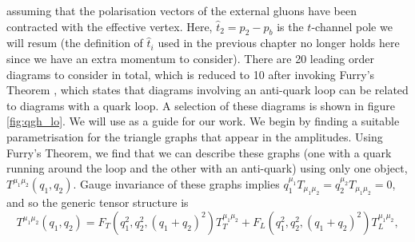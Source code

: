 assuming that the polarisation vectors of the external gluons have been contracted with the effective vertex. Here, $\hat{t}_2 = p_2 - p_b$ is the $t$-channel pole we will resum (the definition of $\hat{t}_i$ used in the previous chapter no longer holds here since we have an extra momentum to consider). There are 20 leading order diagrams to consider in total, which is reduced to 10 after invoking Furry's Theorem \cite{Atkin2015}, which states that diagrams involving an anti-quark loop can be related to diagrams with a quark loop. A selection of these diagrams is shown in figure \ref{fig:qgh_lo}. We will use \cite{DelDuca2001} as a guide for our work. We begin by finding a suitable parametrisation for the triangle graphs that appear in the amplitudes. Using Furry's Theorem, we find that we can describe these graphs (one with a quark running around the loop and the other with an anti-quark) using only one object, $T^{\mu_1 \mu_2}(q_1,q_2)$. Gauge invariance of these graphs implies $q_1^{\mu_1} T_{\mu_1 \mu_2} = q_2^{\mu_2}T_{\mu_1 \mu_2} = 0$, and so the generic tensor structure is
\begin{equation}
T^{\mu_1 \mu_2} (q_1, q_2) = F_T(q_1^2, q_2^2,(q_1+q_2)^2) T_T^{\mu_1 \mu_2} + F_L(q_1^2, q_2^2,(q_1+q_2)^2) T_L^{\mu_1 \mu_2},
\end{equation}
